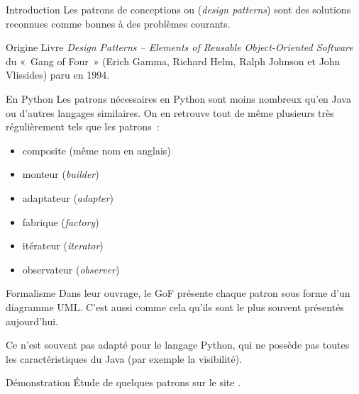 \begin{frame}{Introduction}
  Les patrons de conceptions ou (\textit{design patterns}) sont des solutions reconnues comme bonnes à des problèmes courants.
\end{frame}

\begin{frame}{Origine}
  Livre \textit{Design Patterns – Elements of Reusable Object-Oriented Software} du «~Gang of Four~» (Erich Gamma, Richard Helm, Ralph Johnson et John Vlissides) paru en 1994.
\end{frame}

\begin{frame}{En Python}
  Les patrons nécessaires en Python sont moins nombreux qu'en Java ou d'autres langages similaires.
  On en retrouve tout de même plusieurs très régulièrement tels que les patrons~:

  \begin{itemize}
    \item composite (même nom en anglais)
    \item monteur (\textit{builder})
    \item adaptateur (\textit{adapter})
    \item fabrique (\textit{factory})
    \item itérateur (\textit{iterator})
    \item observateur (\textit{observer})
  \end{itemize}
\end{frame}

\begin{frame}{Formalisme}
  Dans leur ouvrage, le GoF présente chaque patron sous forme d'un diagramme UML.
  C'est aussi comme cela qu'ils sont le plus souvent présentés aujourd'hui.

  Ce n'est souvent pas adapté pour le langage Python, qui ne possède pas toutes les caractéristiques du Java (par exemple la visibilité).
\end{frame}

\begin{frame}{Démonstration}
  Étude de quelques patrons sur le site .
\end{frame}
